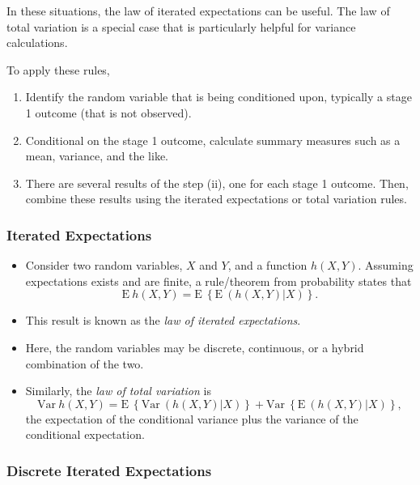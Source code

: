 \documentclass[]{book}
\begin{document}
In these situations, the law of iterated expectations can be useful. The
law of total variation is a special case that is particularly helpful
for variance calculations.

To apply these rules,

\begin{enumerate}
\def\labelenumi{\arabic{enumi}.}
\item
  Identify the random variable that is being conditioned upon, typically
  a stage 1 outcome (that is not observed).
\item
  Conditional on the stage 1 outcome, calculate summary measures such as
  a mean, variance, and the like.
\item
  There are several results of the step (ii), one for each stage 1
  outcome. Then, combine these results using the iterated expectations
  or total variation rules.
\end{enumerate}

\subsubsection{Iterated Expectations}\label{iterated-expectations-1}

\begin{itemize}
\item
  Consider two random variables, \(X\) and \(Y\), and a function
  \(h(X,Y)\). Assuming expectations exists and are finite, a
  rule/theorem from probability states that
  \[\mathrm{E~} h(X,Y)= \mathrm{E~} \left\{ \mathrm{E~} \left( h(X,Y) | X \right) \right \} .\]
\item
  This result is known as the \emph{law of iterated expectations}.
\item
  Here, the random variables may be discrete, continuous, or a hybrid
  combination of the two.
\item
  Similarly, the \emph{law of total variation} is
  \[\mathrm{Var~} h(X,Y)= \mathrm{E~} \left\{ \mathrm{Var~} \left( h(X,Y) | X \right) \right \}
  +\mathrm{Var~} \left\{ \mathrm{E~} \left( h(X,Y) | X \right) \right \},\]
  the expectation of the conditional variance plus the variance of the
  conditional expectation.
\end{itemize}

\subsubsection{Discrete Iterated
Expectations}\label{discrete-iterated-expectations}
\end{document}
